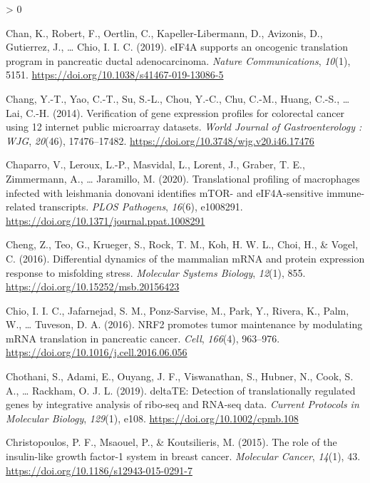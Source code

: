 \documentclass[
  12pt,
  openany]{book}
\newlength{\cslhangindent}
\newenvironment{CSLReferences}[2] %
 {%
  \setlength{\parindent}{0pt}
  \ifodd #1 \everypar{\setlength{\hangindent}{\cslhangindent}}\ignorespaces\fi
  \ifnum #2 > 0
  \setlength{\parskip}{#2\baselineskip}
  \fi
 }%
 {}
\begin{document}
\begin{CSLReferences}{1}{0}
\leavevmode\hypertarget{ref-Chan2019}{}%
Chan, K., Robert, F., Oertlin, C., Kapeller-Libermann, D., Avizonis, D., Gutierrez, J., \ldots{} Chio, I. I. C. (2019). {eIF}4A supports an oncogenic translation program in pancreatic ductal adenocarcinoma. \emph{Nature Communications}, \emph{10}(1), 5151. \url{https://doi.org/10.1038/s41467-019-13086-5}

\leavevmode\hypertarget{ref-Chang2014}{}%
Chang, Y.-T., Yao, C.-T., Su, S.-L., Chou, Y.-C., Chu, C.-M., Huang, C.-S., \ldots{} Lai, C.-H. (2014). Verification of gene expression profiles for colorectal cancer using 12 internet public microarray datasets. \emph{World Journal of Gastroenterology : {WJG}}, \emph{20}(46), 17476--17482. \url{https://doi.org/10.3748/wjg.v20.i46.17476}

\leavevmode\hypertarget{ref-Chaparro2020}{}%
Chaparro, V., Leroux, L.-P., Masvidal, L., Lorent, J., Graber, T. E., Zimmermann, A., \ldots{} Jaramillo, M. (2020). Translational profiling of macrophages infected with leishmania donovani identifies {mTOR}- and {eIF}4A-sensitive immune-related transcripts. \emph{{PLOS} Pathogens}, \emph{16}(6), e1008291. \url{https://doi.org/10.1371/journal.ppat.1008291}

\leavevmode\hypertarget{ref-Cheng2016}{}%
Cheng, Z., Teo, G., Krueger, S., Rock, T. M., Koh, H. W. L., Choi, H., \& Vogel, C. (2016). Differential dynamics of the mammalian {mRNA} and protein expression response to misfolding stress. \emph{Molecular Systems Biology}, \emph{12}(1), 855. \url{https://doi.org/10.15252/msb.20156423}

\leavevmode\hypertarget{ref-Chio2016}{}%
Chio, I. I. C., Jafarnejad, S. M., Ponz-Sarvise, M., Park, Y., Rivera, K., Palm, W., \ldots{} Tuveson, D. A. (2016). {NRF}2 promotes tumor maintenance by modulating {mRNA} translation in pancreatic cancer. \emph{Cell}, \emph{166}(4), 963--976. \url{https://doi.org/10.1016/j.cell.2016.06.056}

\leavevmode\hypertarget{ref-Chothani2019}{}%
Chothani, S., Adami, E., Ouyang, J. F., Viswanathan, S., Hubner, N., Cook, S. A., \ldots{} Rackham, O. J. L. (2019). {deltaTE}: Detection of translationally regulated genes by integrative analysis of ribo-seq and {RNA}-seq data. \emph{Current Protocols in Molecular Biology}, \emph{129}(1), e108. \url{https://doi.org/10.1002/cpmb.108}

\leavevmode\hypertarget{ref-Christopoulos2015}{}%
Christopoulos, P. F., Msaouel, P., \& Koutsilieris, M. (2015). The role of the insulin-like growth factor-1 system in breast cancer. \emph{Molecular Cancer}, \emph{14}(1), 43. \url{https://doi.org/10.1186/s12943-015-0291-7}


\end{CSLReferences}
\end{document}
